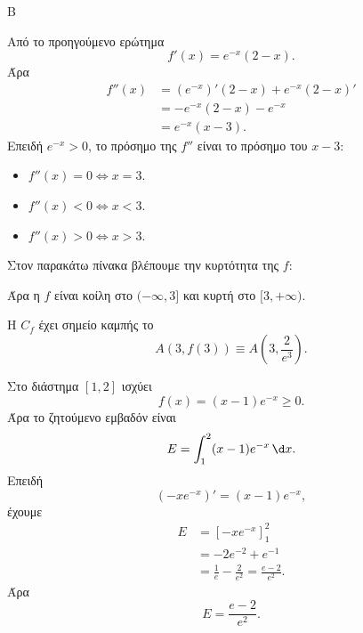 \begin{thema}{Β}
\begin{erwthma}
\item Από το προηγούμενο ερώτημα
\[
f'(x)=e^{-x}(2-x).
\]
Άρα
\begin{align*}
f''(x)&=(e^{-x})'(2-x)+e^{-x}(2-x)'\\
&=-e^{-x}(2-x)-e^{-x}\\
&=e^{-x}(x-3).
\end{align*}
Επειδή $e^{-x}>0$, το πρόσημο της $f''$ είναι το πρόσημο του $x-3$:
\begin{itemize}
\item $f''(x)=0\Leftrightarrow x=3$.
\item $f''(x)<0\Leftrightarrow x<3$.
\item $f''(x)>0\Leftrightarrow x>3$.
\end{itemize}
Στον παρακάτω πίνακα βλέπουμε την κυρτότητα της $f$:
\begin{center}
\end{center}
Άρα η $f$ είναι κοίλη στο $(-\infty,3]$ και κυρτή στο $[3,+\infty)$.

Η $C_f$ έχει σημείο καμπής το
\[
A(3,f(3))\equiv A\left(3,\frac{2}{e^3}\right).
\]

\item Στο διάστημα $[1,2]$ ισχύει
\[
f(x)=(x-1)e^{-x}\geq0.
\]
Άρα το ζητούμενο εμβαδόν είναι
\[
E=\dint_1^2 (x-1)e^{-x}\,\d x.
\]
Επειδή
\[
\left(-xe^{-x}\right)'=(x-1)e^{-x},
\]
έχουμε
\begin{align*}
E&=\left[-xe^{-x}\right]_1^2\\
&=-2e^{-2}+e^{-1}\\
&=\frac{1}{e}-\frac{2}{e^2}
=\frac{e-2}{e^2}.
\end{align*}
Άρα
\[
{E=\frac{e-2}{e^2}}.
\]
\end{erwthma}
\end{thema}

